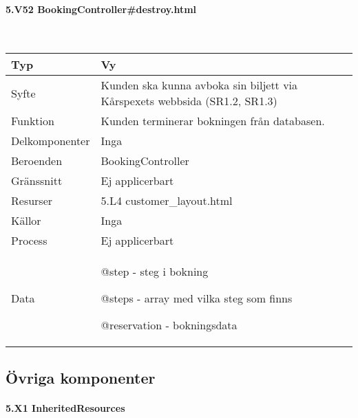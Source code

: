 \documentclass[a4paper, twoside, 11pt, titlepage]{article}
\begin{document}
			\paragraph{5.V52 BookingController\#destroy.html}\

			\begin {table} [ht] \begin{tabular} {  p{3.5cm} p{9.6cm} }
				\hline
				{Typ} & {Vy} \\
				\hline
				{Syfte} & {Kunden ska kunna avboka sin biljett via Kårspexets webbsida (SR1.2, SR1.3)} \\
				\hline
				{Funktion} & {Kunden terminerar bokningen från databasen.} \\
				\hline
				{Delkomponenter} & {Inga} \\
				\hline
				{Beroenden} & {BookingController} \\
				\hline
				{Gränssnitt} & {Ej applicerbart} \\
				\hline
				{Resurser} & {5.L4 customer\_layout.html} \\
				\hline
				{Källor} & {Inga} \\
				\hline
				{Process} & {Ej applicerbart} \\
				\hline
				{Data} & {@step - steg i bokning

@steps - array med vilka steg som finns

@reservation - bokningsdata} \\
				\hline
			\end{tabular} \end{table} \FloatBarrier


	\subsection{Övriga komponenter}



			\paragraph{5.X1 InheritedResources}\
\end{document}

